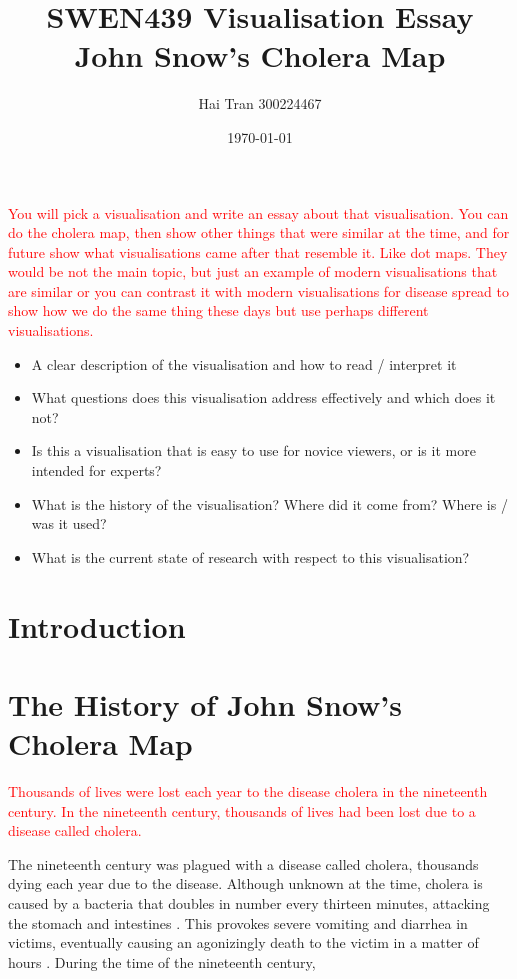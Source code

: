 \documentclass[12pt]{article}
\title{SWEN439 Visualisation Essay \\ John Snow's Cholera Map}
\author{Hai Tran 300224467}
\date{\today}
\newcommand\todo[1]{\textcolor{red}{#1}}
\begin{document}
\maketitle 

\begin{abstract}

\end{abstract}
\textcolor{red}{
You will pick a visualisation and write an essay about that visualisation. 
You can do the cholera map, then show other things that were similar at the time, and for future show what visualisations came after that resemble it. Like dot maps. They would be not the main topic, but just an example of modern visualisations that are similar or you can contrast it with modern visualisations for disease spread to show how we do the same thing these days but use perhaps different visualisations.
}

\begin{itemize}
\item A clear description of the visualisation and how to read / interpret it
\item What questions does this visualisation address effectively and which does it not?
\item Is this a visualisation that is easy to use for novice viewers, or is it more intended for experts?
\item What is the history of the visualisation? Where did it come from? Where is / was it used?
\item What is the current state of research with respect to this visualisation?
\end{itemize}

\section{Introduction}

\section{The History of John Snow's Cholera Map}
\todo{ Thousands of lives were lost each year to the disease cholera in the nineteenth century. In the nineteenth century, thousands of lives had been lost due to a disease called cholera.}

The nineteenth century was plagued with a disease called cholera, thousands dying each year due to the disease. Although unknown at the time, cholera is caused by a bacteria that doubles in number every thirteen minutes, attacking the stomach and intestines \cite{channel1}. This provokes severe vomiting and diarrhea in victims, eventually causing an agonizingly death to the victim in a matter of hours \cite{heros, channel1}. During the time of the nineteenth century, 
\end{document}
